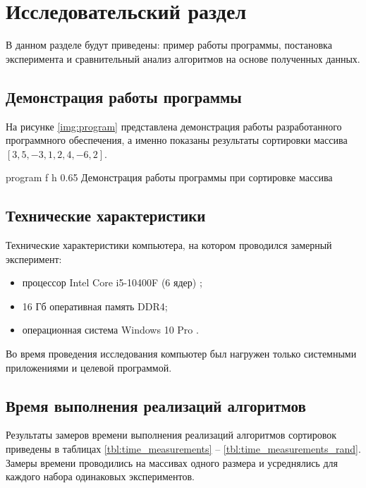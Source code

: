 \chapter{Исследовательский раздел}

В данном разделе будут приведены: пример работы программы, постановка эксперимента и сравнительный анализ алгоритмов на основе полученных данных.

\section{Демонстрация работы программы}


На рисунке \ref{img:program} представлена демонстрация работы разработанного программного обеспечения, а именно показаны результаты сортировки массива $[3, 5, -3, 1, 2, 4, -6, 2]$.

{program} %
{f} %
{h} %
{0.65\textwidth} %
{Демонстрация работы программы при сортировке массива} %

\clearpage


\section{Технические характеристики}

Технические характеристики компьютера, на котором проводился замерный эксперимент:
\begin{itemize}
	\item процессор Intel Core i5-10400F (6 ядер) \cite{intel};
	\item 16 Гб оперативная память DDR4;
	\item операционная система Windows 10 Pro \cite{windows}.
\end{itemize}

Во время проведения исследования компьютер был нагружен только системными приложениями и целевой программой.

\section{Время выполнения реализаций алгоритмов}

Результаты замеров времени выполнения реализаций алгоритмов сортировок приведены в таблицах \ref{tbl:time_measurements} -- \ref{tbl:time_measurements_rand}.
Замеры времени проводились на массивах одного размера и усреднялись для каждого набора одинаковых экспериментов.

